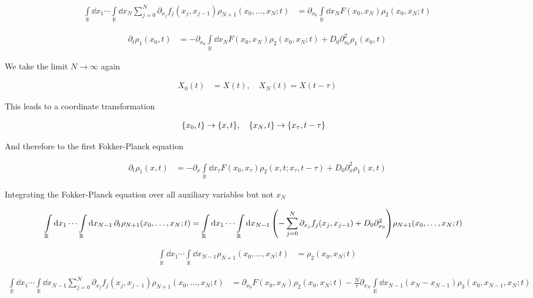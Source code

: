 \documentclass[a4paper,10pt]{article}
\newcommand{\suml}{\sum\limits}
\newcommand{\intl}{\int\limits}
\begin{document}
\begin{align}
	\intl_\mathbb{R}
	\dd{x_1}
	\cdots
	\intl_\mathbb{R}
	\dd{x_N}
	\suml_{j=0}^N
	\partial_{x_j}
	f_j(x_j,x_{j-1})
	\rho_{N+1}(x_0,\ldots,x_N;t)
	&=
	\partial_{x_0}
	\intl_{\mathbb{R}}
	\dd{x_N}
	F(x_0,x_N)
	\rho_{2}(x_0,x_N;t)
\end{align}

\begin{align}
	\partial_t
	\rho_1(x_0,t)
	&=
	-
	\partial_{x_0}
	\intl_\mathbb{R}
	\dd{x_N}
	F(x_0,x_N)
	\rho_2(x_0,x_N;t)
	+
	D_0
	\partial_{x_0}^2
	\rho_1(x_0,t)
\end{align}

We take the limit $N\to\infty$ again

\begin{align}
	X_0(t)
	&=
	X(t)
	,\quad
	X_N(t)
	=
	X(t-\tau)
\end{align}

This leads to a coordinate transformation

\begin{align}
	\Bqty{x_0,t}
	&\to
	\Bqty{x,t}
	,\quad
	\Bqty{x_N,t}
	\to
	\Bqty{x_\tau,t-\tau}
\end{align}

And therefore to the first Fokker-Planck equation

\begin{align}
	\partial_t
	\rho_1(x,t)
	&=
	-
	\partial_{x}
	\intl_\mathbb{R}
	\dd{x_\tau}
	F(x_0,x_\tau)
	\rho_2(x,t;x_\tau,t-\tau)
	+
	D_0
	\partial_{x}^2
	\rho_1(x,t)
\end{align}

Integrating the Fokker-Planck equation over all auxiliary variables but not $x_N$

\begin{align}
	\intl_\mathbb{R}
	\dd{x_1}
	\cdots
	\intl_\mathbb{R}
	\dd{x_{N-1}}
	\partial_t
	\rho_{N+1}(x_0,\ldots,x_N;t)
	&=
	\intl_\mathbb{R}
	\dd{x_1}
	\cdots
	\intl_\mathbb{R}
	\dd{x_{N-1}}
	\pqty{
		-
		\suml_{j=0}^N
		\partial_{x_j}
		f_j(x_j,x_{j-1})
		+
		D_0
		\partial_{x_0}^2
	}
	\rho_{N+1}(x_0,\ldots,x_N;t)
\end{align}

\begin{align}
	\intl_\mathbb{R}
	\dd{x_1}
	\cdots
	\intl_\mathbb{R}
	\dd{x_{N-1}}
	\rho_{N+1}(x_0,\ldots,x_N;t)
	&=
	\rho_{2}(x_0,x_N;t)
\end{align}

\begin{align}
	\intl_\mathbb{R}
	\dd{x_1}
	\cdots
	\intl_\mathbb{R}
	\dd{x_{N-1}}
	\suml_{j=0}^N
	\partial_{x_j}
	f_j(x_j,x_{j-1})
	\rho_{N+1}(x_0,\ldots,x_N;t)
	&=
	\partial_{x_0}
	F(x_0,x_N)
	\rho_{2}(x_0,x_N;t)
	-
	\frac{N}{\tau}
	\partial_{x_N}
	\intl_\mathbb{R}
	\dd{x_{N-1}}
	(x_N-x_{N-1})
	\rho_{3}(x_0,x_{N-1},x_N;t)
\end{align}
\end{document}
